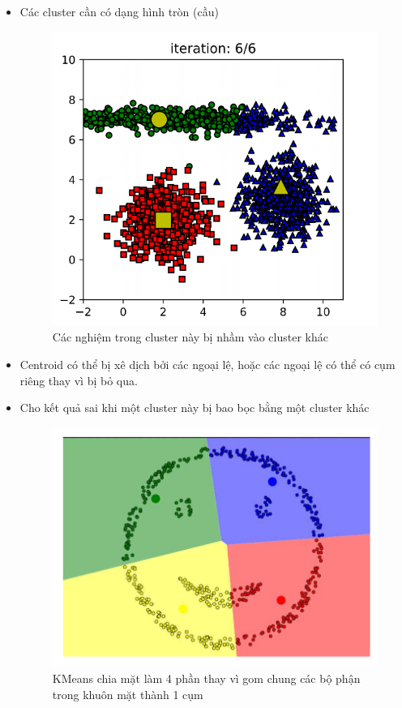 \begin{itemize}
\begin{figure}[h]
	\end{figure}
	\item Các cluster cần có dạng hình tròn (cầu)	
	\begin{figure}[h]
		\centering
		\includegraphics[width=0.3\linewidth]{img/disad_3}
		\caption{Các nghiệm trong cluster này bị nhầm vào cluster khác}
	\end{figure}
	\item Centroid có thể bị xê dịch bởi các ngoại lệ, hoặc các ngoại lệ có thể có cụm riêng thay vì bị bỏ qua.
	\item Cho kết quả sai khi một cluster này bị bao bọc bằng một cluster khác
	\begin{figure}[h]
		\centering
		\includegraphics[width=0.7\linewidth]{img/disad_4}
		\caption{KMeans chia mặt làm 4 phần thay vì gom chung các bộ phận trong khuôn mặt thành 1 cụm}
	\end{figure}	
\end{itemize}
\newpage